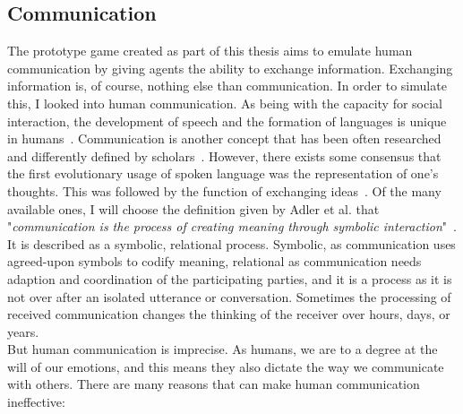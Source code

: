 \subsection{Communication}
The prototype game created as part of this thesis aims to emulate human communication by giving agents the ability to exchange information. Exchanging information is, of course, nothing else than communication. In order to simulate this, I looked into human communication. As being with the capacity for social interaction, the development of speech and the formation of languages is unique in humans~\cite{Levinson2006}. Communication is another concept that has been often researched and differently defined by scholars~\cite{Littlejohn2010}. However, there exists some consensus that the first evolutionary usage of spoken language was the representation of one's thoughts. This was followed by the function of exchanging ideas~\cite{Ruben1985}. Of the many available ones, I will choose the definition given by Adler et al. that "\textit{communication is the process of creating meaning through symbolic interaction}"~\cite{Adler2016}. It is described as a symbolic, relational process. Symbolic, as communication uses agreed-upon symbols to codify meaning, relational as communication needs adaption and coordination of the participating parties, and it is a process as it is not over after an isolated utterance or conversation. Sometimes the processing of received communication changes the thinking of the receiver over hours, days, or years.~\cite{Adler2016}\\
But human communication is imprecise. As humans, we are to a degree at the will of our emotions, and this means they also dictate the way we communicate with others. There are many reasons that can make human communication ineffective:
